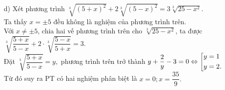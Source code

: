 \begin{bt}
{\begin{itemize}
	Đặt $\heva{& 2x+1=a^3 \\& 2-x=b^3\\&x+2=c^3} \Rightarrow 2x+5 =a^3+b^3+c^3.$\\
	Phương trình $(1)$ trở thành $a+b+c= \sqrt[3]{a^3+b^3+c^3}$
	\begin{align*}
	&\Leftrightarrow (a+b+c)^3=a^3+b^3+c^3\\& \Leftrightarrow 3(a+b)(b+c)(c+a)=0.
	\end{align*}
	Từ đó suy ra PT $(1)$ có hai nghiệm phân biệt $x=-3; x=-1.$
	\item [d)] Xét phương trình $\sqrt[3]{(5+x)^2}+2 \sqrt[3]{(5-x)^2}=3 \sqrt[3]{25-x^2}.$\\
	Ta thấy $x=\pm 5$ đều không là nghiệm của phương trình trên.\\
	Với $x \neq \pm 5$, chia hai vế phương trình  trên cho $\sqrt[3]{25-x^2}$, ta được $\sqrt[3]{\dfrac{5+x}{5-x}}+2\cdot \sqrt[3]{\dfrac{5-x}{5+x}}=3.$\\
	Đặt $\sqrt[3]{\dfrac{5+x}{5-x}} =y,$ phương trình trên trở thành $y+ \dfrac{2}{y}-3=0 \Leftrightarrow \left[\begin{aligned}&y=1\\&y=2.\end{aligned}\right.$\\
	Từ đó suy ra PT có hai nghiệm phân biệt là $x=0; x= \dfrac{35}{9}.$ 
\end{itemize}

}
\end{bt}
